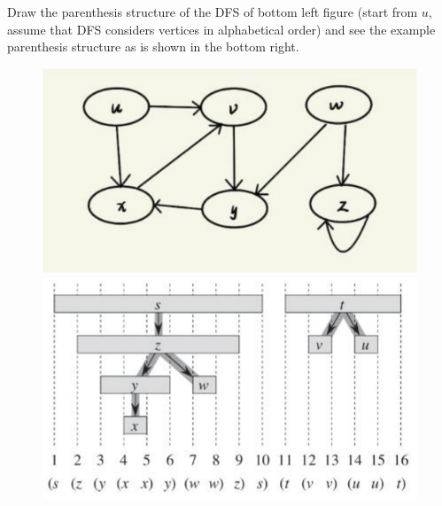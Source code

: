 \noindent {}
Draw the parenthesis structure of the DFS of bottom left figure (start from $u$, assume that DFS considers vertices in alphabetical order) and see the example parenthesis structure as is shown in the bottom right.
\begin{figure}[!h]
    \centering
    \includegraphics[width=0.48\linewidth]{HWs/HW8/figures/2_1.png}
    \quad
    \includegraphics[width=0.48\linewidth]{HWs/HW8/figures/2_2.png}
\end{figure}

\noindent {}